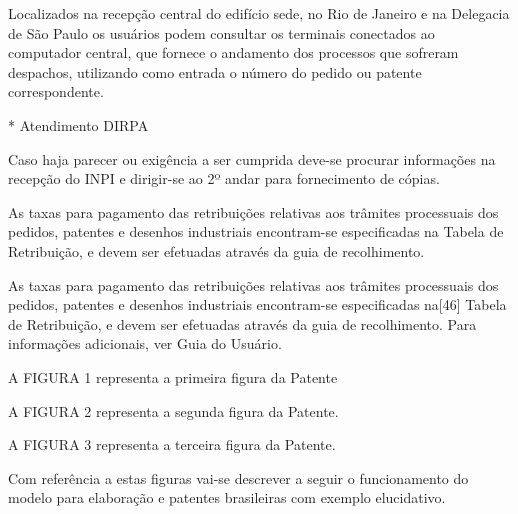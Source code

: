 \documentclass[12pt]{article}
\begin{document}
     Localizados na recepção central do edifício sede, no Rio de
     Janeiro e na Delegacia de São Paulo os usuários podem consultar
     os terminais conectados ao computador central, que fornece o
     andamento dos processos que sofreram despachos, utilizando como
     entrada o número do pedido ou patente correspondente.

     * Atendimento DIRPA
     
     Caso haja parecer ou exigência a ser cumprida deve-se procurar
     informações na recepção do INPI e dirigir-se ao 2º andar para
     fornecimento de cópias.
     
     As taxas para pagamento das retribuições relativas aos trâmites
     processuais dos pedidos, patentes e desenhos industriais
     encontram-se especificadas na Tabela de Retribuição, e devem ser
     efetuadas através da guia de recolhimento.
     
     As taxas para pagamento das retribuições relativas aos trâmites
     processuais dos pedidos, patentes e desenhos industriais
     encontram-se especificadas na[46] Tabela de Retribuição, e devem
     ser efetuadas através da guia de recolhimento. Para informações
     adicionais, ver Guia do Usuário.



A FIGURA 1 representa a primeira figura da Patente

A FIGURA 2 representa a segunda figura da Patente.

A FIGURA 3 representa a terceira figura da Patente.





Com referência a estas figuras vai-se descrever a seguir o
funcionamento do modelo para elaboração e patentes brasileiras com
exemplo elucidativo.
\end{document}

